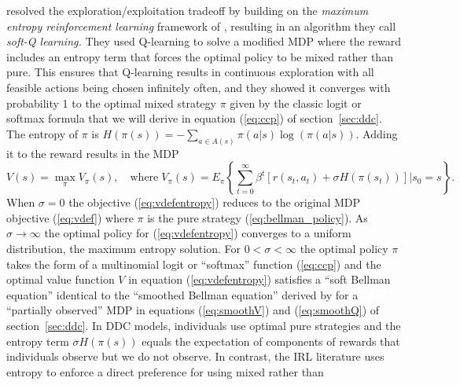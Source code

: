 \citet{softqlearning:2017} resolved the exploration/exploitation tradeoff  by 
 building on the {\it maximum entropy reinforcement learning\/} framework of \citep{ziebart:2008},
resulting in an algorithm they call {\it soft-Q learning.\/} 
They used Q-learning to solve a modified  MDP where the reward
 includes an entropy term that forces the optimal policy to be mixed rather than pure.
This ensures that Q-learning results in continuous exploration with all feasible actions being
chosen infinitely often, and they showed
it converges with probability 1 to the optimal mixed strategy $\pi$ given by the classic logit
or softmax formula that we will derive in equation (\ref{eq:ccp}) of section~\ref{sec:ddc}. 
The entropy of $\pi$ is $H(\pi(s))=-\sum_{a \in A(s)}\pi(a|s)\log(\pi(a|s))$. Adding it to the
reward results in the  MDP
\begin{equation}
       V(s)= \max_\pi  V_\pi(s),  \quad \mbox{where} \;  V_\pi(s) = E_\pi \left\{\sum_{t=0}^\infty \beta^t[r(s_t,a_t)+\sigma H(\pi(s_t))]| s_0=s\right\}.
\label{eq:vdefentropy}
\end{equation}
When $\sigma=0$ the objective (\ref{eq:vdefentropy}) reduces to the original MDP objective
(\ref{eq:vdef}) where $\pi$ is the pure strategy (\ref{eq:bellman_policy}). 
As $\sigma \to \infty$ the optimal policy for (\ref{eq:vdefentropy}) converges to a uniform distribution,
the maximum entropy solution. For $0 < \sigma < \infty$ the optimal
policy $\pi$ takes the form of a multinomial logit or ``softmax'' function (\ref{eq:ccp})
and the optimal value function $V$  in equation  
(\ref{eq:vdefentropy}) satisfies a ``soft Bellman equation'' identical
to the ``smoothed Bellman equation'' derived by \citet{rust:1988} for a ``partially observed'' MDP 
in equations  (\ref{eq:smoothV}) and (\ref{eq:smoothQ}) of section~\ref{sec:ddc}. In DDC models, individuals
use optimal pure strategies and the
entropy term $\sigma H(\pi(s))$ equals the expectation of components of rewards  that individuals
observe but we  do not observe. In contrast, the IRL literature uses entropy 
to enforce a direct preference for using mixed rather than 
